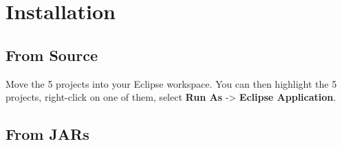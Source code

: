\section{Installation}
\subsection{From Source}
Move the 5 projects into your Eclipse workspace. You can then highlight the 5 projects, right-click on
one of them, select \textbf{Run As} -> \textbf{Eclipse Application}. 
\subsection{From JARs}

